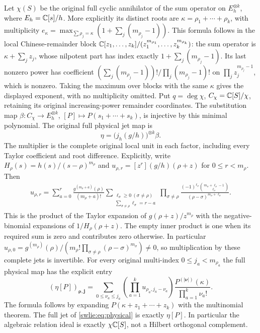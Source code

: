 \documentclass[11pt]{article}
\begin{document}
Let $\chi(S)$ be the original full cyclic annihilator of
the sum operator on $E_h^{\otimes k}$, where
$E_h=\mathbb C[s]/h$. More explicitly its distinct roots are
$\kappa=\rho_1+\cdots+\rho_k$, with multiplicity
$e_\kappa=\max_{\sum\rho_j=\kappa}(1+\sum_j(m_{\rho_j}-1))$.
This formula follows in the local Chinese-remainder block
$\mathbb C[z_1,\ldots,z_k]/(z_1^{m_{\rho_1}},\ldots,z_k^{m_{\rho_k}})$:
the sum operator is $\kappa+\sum_jz_j$,
whose nilpotent part has index exactly
$1+\sum_j(m_{\rho_j}-1)$. Its last nonzero power has
coefficient
$(\sum_j(m_{\rho_j}-1))!/\prod_j(m_{\rho_j}-1)!$
on $\prod_jz_j^{m_{\rho_j}-1}$, which is nonzero.
Taking the maximum over blocks with the same $\kappa$
gives the displayed exponent, with no multiplicity omitted.
Put $q=\deg\chi$, $C_\chi=\mathbb C[S]/\chi$, retaining its
original increasing-power remainder coordinates.
The substitution map
$\beta:C_\chi\to E_h^{\otimes k}$,
$[P]\mapsto P(s_1+\cdots+s_k)$, is injective by this
minimal polynomial. The original full physical jet map is
\begin{equation}\label{swlie:eq:unitreceiver}
 \eta=\bigl(j_h(g/h)\bigr)^{\otimes k}\beta.
\end{equation}
The multiplier is the complete original local unit in
each factor, including every Taylor coefficient and
root difference. Explicitly, write $H_\rho(s)=h(s)/(s-\rho)^{m_\rho}$
and $u_{\rho,r}=[z^r](g/h)(\rho+z)$ for $0\leq r<m_\rho$.
Then
\begin{equation}\label{swlie:eq:unitcoefficients}
 \begin{split}
 u_{\rho,r}
 =\sum_{a=0}^r\frac{g^{(m_\rho+a)}(\rho)}{(m_\rho+a)!}
 \sum_{\substack{\ell_\sigma\geq0\ (\sigma\ne\rho)\\
                 \sum_{\sigma\ne\rho}\ell_\sigma=r-a}}
 \prod_{\sigma\ne\rho}
 \frac{(-1)^{\ell_\sigma}
       \binom{m_\sigma+\ell_\sigma-1}{\ell_\sigma}}
      {(\rho-\sigma)^{m_\sigma+\ell_\sigma}} .
 \end{split}
\end{equation}
This is the product of the Taylor expansion of
$g(\rho+z)/z^{m_\rho}$ with the negative-binomial
expansions of $1/H_\rho(\rho+z)$.
The empty inner product is one when its required sum is
zero and contributes zero otherwise.
In particular
$u_{\rho,0}=g^{(m_\rho)}(\rho)/
 (m_\rho!\prod_{\sigma\ne\rho}(\rho-\sigma)^{m_\sigma})\ne0$,
so multiplication by these complete jets is invertible.
For every original multi-index $0\leq j_a<m_{\rho_a}$ the
full physical map has the explicit entry
\begin{equation}\label{swlie:eq:etajets}
 (\eta[P])_{\boldsymbol\rho,\boldsymbol j}
 =\sum_{0\leq\nu_a\leq j_a}
     \left(\prod_{a=1}^k u_{\rho_a,j_a-\nu_a}\right)
          \frac{P^{(|\boldsymbol\nu|)}(\kappa)}
               {\prod_{a=1}^k\nu_a!}.
\end{equation}
The formula follows by expanding
$P(\kappa+z_1+\cdots+z_k)$ with the multinomial theorem.
The full jet of \eqref{swlie:eq:physical}
is exactly $\eta[P]$. In particular the algebraic
relation ideal is exactly $\chi\mathbb C[S]$, not a
Hilbert orthogonal complement.
\end{document}
